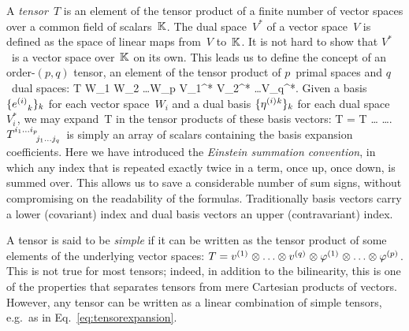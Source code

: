 A \emph{tensor}~$T$ is an element of the tensor product of a finite
number of vector spaces over a common field of scalars~${\mathbb K}$.
The dual space~$V^*$ of a vector space~$V$ is defined as the space of
linear maps from~$V$ to~${\mathbb K}$. It is not hard to show that $V^*$~is a
vector space over~${\mathbb K}$ on its own. This leads us to define
the concept of an order-$(p,q)$ tensor, an element of the tensor product
of $p$~primal spaces and $q$~dual spaces:
\be
T \in W_1 \otimes W_2 \otimes \ldots \otimes W_p \otimes V_1^* \otimes V_2^* \otimes \ldots \otimes V_q^*.
\ee
Given a basis $\{\bv\spidx{i}{}{k}\}_k$ for each vector
space~$W_i$ and a dual basis $\{\eta\spidx{i}{k}{}\}_k$ for each dual space~$V_i^*$,
we may expand~T in the tensor products of these basis vectors:
\be
\label{eq:tensorexpansion}
T = T
\bv{} \otimes \ldots \otimes \bv{}
\otimes
\eta{} \otimes \ldots \otimes \eta{}.
\ee
$T\indices{^{i_1 \ldots i_p}_{j_1 \ldots j_q}}$ is simply an array of
scalars containing the basis expansion coefficients.
Here we have introduced the \emph{Einstein summation convention}, in which
any index that is repeated exactly twice in a term, once up, once
down, is summed over. This allows us to save a considerable number of
sum signs, without compromising on the readability of the formulas.
Traditionally basis vectors carry a lower (covariant) index and dual basis vectors
an upper (contravariant) index.

A tensor is said to be \emph{simple} if it can be written as the tensor product
of some elements of the underlying vector spaces:
$T = v\spidx{1}{}{} \otimes \ldots \otimes v\spidx{q}{}{} \otimes \varphi\spidx{1}{}{} \otimes \ldots \otimes \varphi\spidx{p}{}{}$.
This is not true for most tensors; indeed, in addition to the
bilinearity, this is one of the properties that separates tensors from mere Cartesian products of vectors.
However, any tensor can be written as a linear combination of simple tensors,
e.g.~as in Eq.~\eqref{eq:tensorexpansion}.


